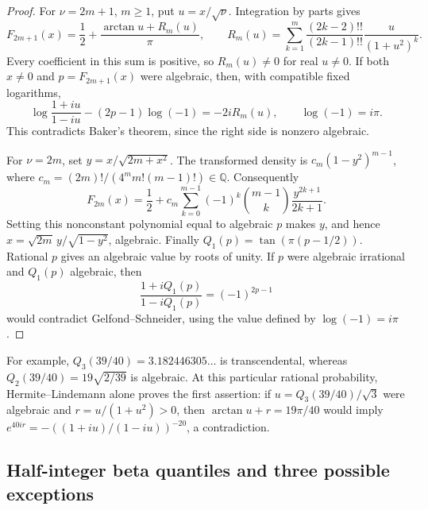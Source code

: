 \documentclass[11pt,a4paper]{article}
\theoremstyle{definition}
\theoremstyle{remark}
\numberwithin{equation}{section}
\begin{document}
\begin{proof}
For $\nu=2m+1$, $m\ge1$, put $u=x/\sqrt\nu$. Integration by parts gives
\begin{equation}
\label{beta-stats-eq-odd-student}
F_{2m+1}(x)=\frac12+\frac{\arctan u+R_m(u)}\pi,
\qquad
R_m(u)=\sum_{k=1}^{m}
\frac{(2k-2)!!}{(2k-1)!!}\frac{u}{(1+u^2)^k}.
\end{equation}
Every coefficient in this sum is positive, so $R_m(u)\ne0$ for real
$u\ne0$. If both $x\ne0$ and $p=F_{2m+1}(x)$ were algebraic, then,
with compatible fixed logarithms,
\[
\log\frac{1+iu}{1-iu}-(2p-1)\log(-1)=-2iR_m(u),
\qquad \log(-1)=i\pi.
\]
This contradicts Baker's theorem, since the right side is nonzero
algebraic.

For $\nu=2m$, set $y=x/\sqrt{2m+x^2}$. The transformed density is
$c_m(1-y^2)^{m-1}$, where
$c_m=(2m)!/(4^m m!(m-1)!)\in\mathbb Q$. Consequently
\[
F_{2m}(x)=\frac12+c_m\sum_{k=0}^{m-1}
(-1)^k\binom{m-1}{k}\frac{y^{2k+1}}{2k+1}.
\]
Setting this nonconstant polynomial equal to algebraic $p$ makes $y$,
and hence $x=\sqrt{2m}\,y/\sqrt{1-y^2}$, algebraic.
Finally $Q_1(p)=\tan(\pi(p-1/2))$. Rational $p$ gives an algebraic value
by roots of unity. If $p$ were algebraic irrational and $Q_1(p)$
algebraic, then
\[
\frac{1+iQ_1(p)}{1-iQ_1(p)}=(-1)^{2p-1}
\]
would contradict Gelfond--Schneider, using the value defined by
$\log(-1)=i\pi$.
\end{proof}

For example, $Q_3(39/40)=3.182446305\ldots$ is transcendental, whereas
$Q_2(39/40)=19\sqrt{2/39}$ is algebraic. At this particular rational
probability, Hermite--Lindemann alone proves the first assertion:
if $u=Q_3(39/40)/\sqrt3$ were algebraic and
$r=u/(1+u^2)>0$, then $\arctan u+r=19\pi/40$ would imply
$e^{40ir}=-((1+iu)/(1-iu))^{-20}$, a contradiction.

\subsection{Half-integer beta quantiles and three possible exceptions}
\end{document}
